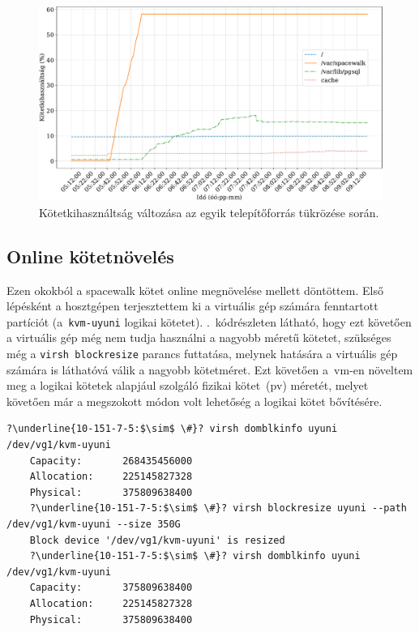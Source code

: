 \begin{figure}[ht]
	\centering
	\includegraphics[width=15cm]{figures/reposync-leap-oss-disk-grid.pdf}
	\caption{Kötetkihasználtság változása az egyik telepítőforrás tükrözése során.}
	\label{fig:reposync-disk-usage}
\end{figure}

\subsection{Online kötetnövelés}
Ezen okokból a spacewalk kötet online megnövelése mellett döntöttem. Első lépésként a hosztgépen terjesztettem ki a virtuális gép számára fenntartott partíciót (a~\texttt{kvm-uyuni} logikai kötetet). .~kódrészleten látható, hogy ezt követően a virtuális gép még nem tudja használni a nagyobb méretű kötetet, szükséges még a \texttt{virsh blockresize} parancs futtatása, melynek hatására a virtuális gép számára is láthatóvá válik a nagyobb kötetméret. Ezt követően a~\acrshort{vm}-en növeltem meg a logikai kötetek alapjául szolgáló fizikai kötet~(\acrshort{pv}) méretét, melyet követően már a megszokott módon volt lehetőség a logikai kötet bővítésére.

\vspace{2mm}
\begin{lstlisting}[caption=Az infrastruktúramenedzsment-programokat futtató virtuális gép kötetének online megnövelése a gazdagépen.,label=lst:virsh-blockresize,escapechar=?]
	?\underline{10-151-7-5:$\sim$ \#}? virsh domblkinfo uyuni /dev/vg1/kvm-uyuni
	Capacity:       268435456000
	Allocation:     225145827328
	Physical:       375809638400
	?\underline{10-151-7-5:$\sim$ \#}? virsh blockresize uyuni --path /dev/vg1/kvm-uyuni --size 350G
	Block device '/dev/vg1/kvm-uyuni' is resized
	?\underline{10-151-7-5:$\sim$ \#}? virsh domblkinfo uyuni /dev/vg1/kvm-uyuni
	Capacity:       375809638400
	Allocation:     225145827328
	Physical:       375809638400
\end{lstlisting}

